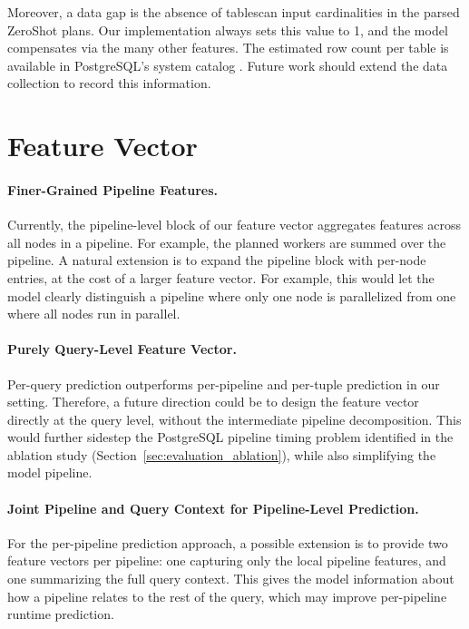 Moreover, a data gap is the absence of tablescan input cardinalities in the parsed ZeroShot plans.
Our implementation always sets this value to 1, and the model compensates via the many other features.
The estimated row count per table is available in PostgreSQL's system catalog \parencite{postgresql_docs_pg_class}.
Future work should extend the data collection to record this information.

\section{Feature Vector}

\paragraph{Finer-Grained Pipeline Features.}
Currently, the pipeline-level block of our feature vector aggregates features across all nodes in a pipeline.
For example, the planned workers are summed over the pipeline.
A natural extension is to expand the pipeline block with per-node entries,
at the cost of a larger feature vector.
For example, this would let the model clearly distinguish a pipeline where only one node is parallelized
from one where all nodes run in parallel.

\paragraph{Purely Query-Level Feature Vector.}
Per-query prediction outperforms per-pipeline and per-tuple prediction in our setting.
Therefore, a future direction could be to design the feature vector directly at the query level,
without the intermediate pipeline decomposition.
This would further sidestep the PostgreSQL pipeline timing problem identified in the ablation study
(Section~\ref{sec:evaluation_ablation}), while also simplifying the model pipeline.

\paragraph{Joint Pipeline and Query Context for Pipeline-Level Prediction.}
For the per-pipeline prediction approach, a possible extension is to provide
two feature vectors per pipeline: one capturing only the local pipeline features,
and one summarizing the full query context.
This gives the model information about how a pipeline relates to the rest of the query,
which may improve per-pipeline runtime prediction.

